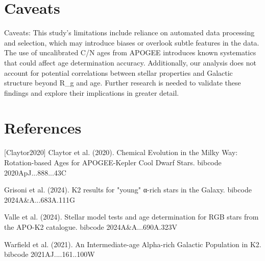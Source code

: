 \documentclass[twocolumn]{aastex631}
\begin{document}
\section{Caveats}
Caveats: This study's limitations include reliance on automated data processing and selection, which may introduce biases or overlook subtle features in the data. The use of uncalibrated C/N ages from APOGEE introduces known systematics that could affect age determination accuracy. Additionally, our analysis does not account for potential correlations between stellar properties and Galactic structure beyond R\_g and age. Further research is needed to validate these findings and explore their implications in greater detail.
\section*{References}
\footnotesize
[Claytor2020] Claytor et al. (2020). Chemical Evolution in the Milky Way: Rotation-based Ages for APOGEE-Kepler Cool Dwarf Stars. bibcode 2020ApJ...888...43C \par [Grisoni2024] Grisoni et al. (2024). K2 results for "young" α-rich stars in the Galaxy. bibcode 2024A\&A...683A.111G \par [Valle2024] Valle et al. (2024). Stellar model tests and age determination for RGB stars from the APO-K2 catalogue. bibcode 2024A\&A...690A.323V \par [Warfield2021] Warfield et al. (2021). An Intermediate-age Alpha-rich Galactic Population in K2. bibcode 2021AJ....161..100W
\end{document}
